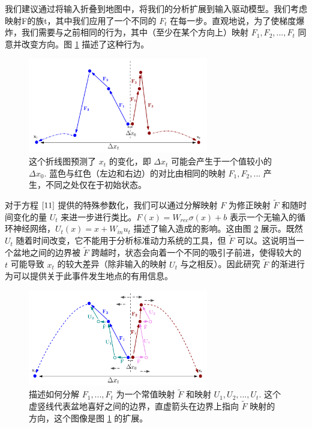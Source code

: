 我们建议通过将输入折叠到地图中，将我们的分析扩展到输入驱动模型。我们考虑映射F的族t，其中我们应用了一个不同的 \(F_t\) 在每一步。直观地说，为了使梯度爆炸，我们需要与之前相同的行为，其中（至少在某个方向上）映射 \(F_1, F_2, ..., F_t\) 同意并改变方向。图 \ref{fig:map} 描述了这种行为。

\begin{figure}[htbp]
  \centering
  \includegraphics[width=0.7\textwidth]{figures/IMG_E030C30FCBC0-1.jpeg}
  \caption{这个折线图预测了 \(x_t\) 的变化，即 \(\Delta x_t\)
    可能会产生于一个值较小的
    \(\Delta x_0\). 蓝色与红色（左边和右边）的对比由相同的映射
    \(F_1, F_2, ...\) 产生，不同之处仅在于初始状态。}
  \label{fig:map}
\end{figure}

对于方程 \(\eqref{11}\) 提供的特殊参数化，我们可以通过分解映射 \(F\) 为修正映射 \(\widetilde{F}\) 和随时间变化的量 \(U_t\) 来进一步进行类比。\(F(x)=W_{rec}\sigma(x)+b\) 表示一个无输入的循环神经网络，\(U_t(x) = x+W_{in}u_t\) 描述了输入造成的影响。这由图 \ref{fig:decompose} 展示。既然 \(U_t\) 随着时间改变，它不能用于分析标准动力系统的工具，但 \(\widetilde{F}\) 可以。这说明当一个盆地之间的边界被 \(\widetilde{F}\) 跨越时，状态会向着一个不同的吸引子前进，使得较大的 \(t\) 可能导致 \(x_t\) 的较大差异（除非输入的映射 \(U_t\) 与之相反）。因此研究 \(\widetilde{F}\) 的渐进行为可以提供关于此事件发生地点的有用信息。

\begin{figure}[htbp]
  \centering
  \includegraphics[width=0.7\textwidth]{figures/IMG_F89255872C0E-1.jpeg}
  \caption{描述如何分解 \(F_1, ..., F_t\) 为一个常值映射 \(\widetilde{F}\)
    和映射
    \(U_1, U_2, ..., U_t\). 这个虚竖线代表盆地喜好之间的边界，直虚箭头在边界上指向
    \(\widetilde{F}\) 映射的方向，这个图像是图 \ref{fig:map} 的扩展。}
  \label{fig:decompose}
\end{figure}

